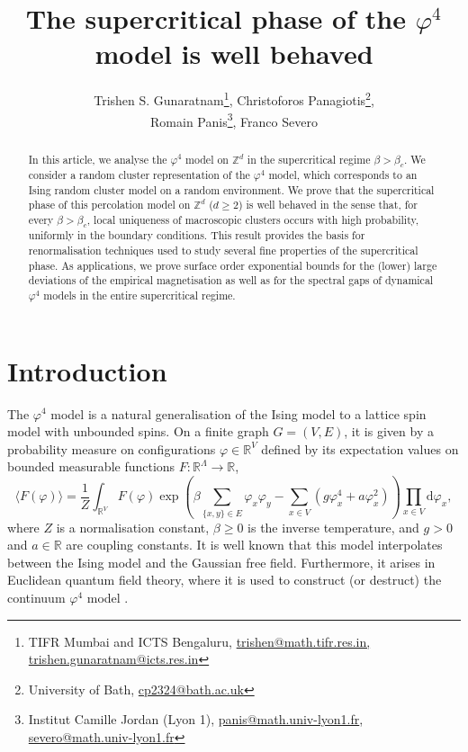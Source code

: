 \documentclass[11pt,a4paper]{article}
\theoremstyle{definition}
\numberwithin{equation}{section}
\begin{document}
\title{The supercritical phase of the $\varphi^4$ model is well behaved}

\author{Trishen S. Gunaratnam\footnotemark[1]\footnote{TIFR Mumbai and ICTS Bengaluru, \url{trishen@math.tifr.res.in, trishen.gunaratnam@icts.res.in}}\:, Christoforos Panagiotis\footnotemark[2]\footnote{University of Bath, \url{cp2324@bath.ac.uk}}\:, \\ Romain Panis\footnotemark[3]\footnote{Institut Camille Jordan (Lyon 1), \url{panis@math.univ-lyon1.fr}, \url{severo@math.univ-lyon1.fr}}\:, Franco Severo\footnotemark[3]}

\maketitle

\begin{abstract}
In this article, we analyse the $\varphi^4$ model on $\mathbb Z^d$ in the supercritical regime $\beta > \beta_c$. We consider a random cluster representation of the $\varphi^4$ model, which corresponds to an Ising random cluster model on a random environment. We prove that the supercritical phase of this percolation model on $\mathbb Z^d$ ($d\geq 2$) is well behaved in the sense that, for every $\beta>\beta_c$, local uniqueness of macroscopic clusters occurs with high probability, uniformly in the boundary conditions. This result provides the basis for renormalisation techniques used to study several fine properties of the supercritical phase.  As applications, we prove surface order exponential bounds for the (lower) large deviations of the empirical magnetisation as well as for the spectral gaps of dynamical $\varphi^4$ models in the entire supercritical regime.
\end{abstract}

\tableofcontents

\section{Introduction}

The $\varphi^4$ model is a natural generalisation of the Ising model to a lattice spin model with unbounded spins. On a finite graph $G=(V,E)$, it is given by a probability measure on configurations $\varphi \in \mathbb R^V$ defined by its expectation values on bounded measurable functions $F:\mathbb R^\Lambda \rightarrow \mathbb R$,
\begin{equation}
\langle F(\varphi)\rangle = \frac{1}{Z} \int_{\mathbb R^V} F(\varphi)\exp \left( \beta \sum_{\{x,y\} \in E} \varphi_x\varphi_y -\sum_{x \in V}(g\varphi_x^4+a\varphi_x^2) \right) \prod_{x \in V} \mathrm{d}\varphi_x,
\end{equation}
where $Z$ is a normalisation constant, $\beta \geq 0$ is the inverse temperature, and $g>0$ and $a \in \mathbb R$ are coupling constants. It is well known that this model interpolates between the Ising model and the Gaussian free field. Furthermore, it arises in Euclidean quantum field theory, where it is used to construct (or destruct) the continuum $\varphi^4$ model \cite{Nelson1966PHI42d,GlimmJaffe1973PHI43d,Sokal1982Destructive,AizenmanGeometricAnalysis1982,FrohlichTriviality1982,AizenmanDuminilTriviality2021}.
\end{document}
